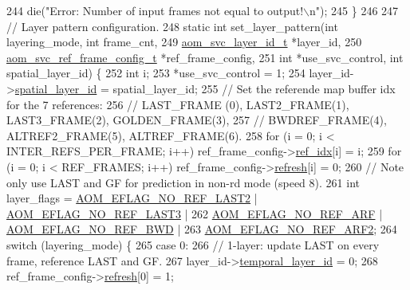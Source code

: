 \begin{DoxyCodeInclude}
{{{{{{{{{244     die(\textcolor{stringliteral}{"Error: Number of input frames not equal to output!\(\backslash\)n"});
245 \}
246 
247 \textcolor{comment}{// Layer pattern configuration.}
248 \textcolor{keyword}{static} \textcolor{keywordtype}{int} set\_layer\_pattern(\textcolor{keywordtype}{int} layering\_mode, \textcolor{keywordtype}{int} frame\_cnt,
249                              \hyperlink{structaom__svc__layer__id}{aom\_svc\_layer\_id\_t} *layer\_id,
250                              \hyperlink{structaom__svc__ref__frame__config}{aom\_svc\_ref\_frame\_config\_t} *ref\_frame\_config,
251                              \textcolor{keywordtype}{int} *use\_svc\_control, \textcolor{keywordtype}{int} spatial\_layer\_id) \{
252   \textcolor{keywordtype}{int} i;
253   *use\_svc\_control = 1;
254   layer\_id->\hyperlink{structaom__svc__layer__id_af018f2e9cc472827a75b92a78ba6ee4e}{spatial\_layer\_id} = spatial\_layer\_id;
255   \textcolor{comment}{// Set the referende map buffer idx for the 7 references:}
256   \textcolor{comment}{// LAST\_FRAME (0), LAST2\_FRAME(1), LAST3\_FRAME(2), GOLDEN\_FRAME(3),}
257   \textcolor{comment}{// BWDREF\_FRAME(4), ALTREF2\_FRAME(5), ALTREF\_FRAME(6).}
258   \textcolor{keywordflow}{for} (i = 0; i < INTER\_REFS\_PER\_FRAME; i++) ref\_frame\_config->\hyperlink{structaom__svc__ref__frame__config_ae6f0dece96f18986127eb6c2ee66c210}{ref\_idx}[i] = i;
259   for (i = 0; i < REF\_FRAMES; i++) ref\_frame\_config->\hyperlink{structaom__svc__ref__frame__config_ab2a4596eadeaf5b7730588367918beda}{refresh}[i] = 0;
260   \textcolor{comment}{// Note only use LAST and GF for prediction in non-rd mode (speed 8).}
261   \textcolor{keywordtype}{int} layer\_flags = \hyperlink{group__aom__encoder_ga50c2560ca6670298cfc614ecae96a391}{AOM\_EFLAG\_NO\_REF\_LAST2} | 
      \hyperlink{group__aom__encoder_gaa4bc8ae2b977b73f0ef57ba428ca1d2c}{AOM\_EFLAG\_NO\_REF\_LAST3} |
262                     \hyperlink{group__aom__encoder_ga9e2f989737d63ddf4e987a525d186a46}{AOM\_EFLAG\_NO\_REF\_ARF} | 
      \hyperlink{group__aom__encoder_ga758649aa6cd9fefb15ad888489884a38}{AOM\_EFLAG\_NO\_REF\_BWD} |
263                     \hyperlink{group__aom__encoder_gad04799a74215e1b9609f7ccd1766f8c9}{AOM\_EFLAG\_NO\_REF\_ARF2};
264   switch (layering\_mode) \{
265     \textcolor{keywordflow}{case} 0:
266       \textcolor{comment}{// 1-layer: update LAST on every frame, reference LAST and GF.}
267       layer\_id->\hyperlink{structaom__svc__layer__id_a9a28c1b126e8d1fdda6e1d881afb66fb}{temporal\_layer\_id} = 0;
268       ref\_frame\_config->\hyperlink{structaom__svc__ref__frame__config_ab2a4596eadeaf5b7730588367918beda}{refresh}[0] = 1;
}}}}}}}}}
\end{DoxyCodeInclude}
